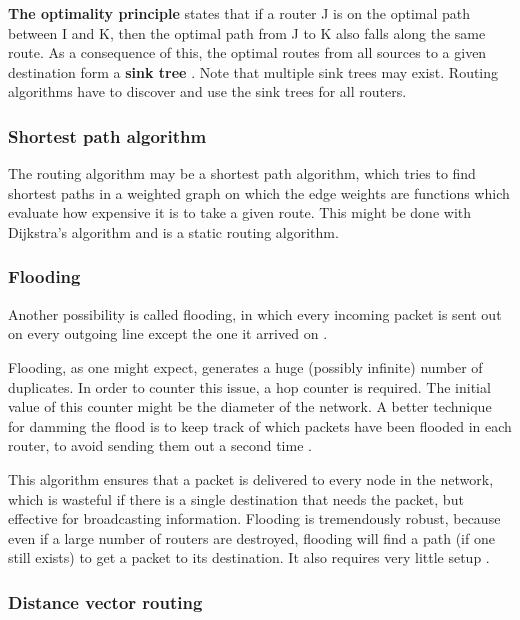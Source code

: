 \textbf{The optimality principle} states that if a router J is on the optimal path between I and K, then the optimal path from J to K also falls along the same route. As a consequence of this, the optimal routes from all sources to a given destination form a \textbf{sink tree} \cite{dynamic-programming-bellman-2003}. Note that multiple sink trees may exist. Routing algorithms have to discover and use the sink trees for all routers.

\subsubsection{Shortest path algorithm}\label{Shortest path algorithm}

The routing algorithm may be a shortest path algorithm, which tries to find shortest paths in a weighted graph on which the edge weights are functions which evaluate how expensive it is to take a given route.
This might be done with Dijkstra's algorithm and is a static routing algorithm.

\subsubsection{Flooding}

Another possibility is called flooding, in which every incoming packet is sent out on every outgoing line except the one it arrived on \cite[p.~368]{computer-networks-tanenbaum-2012}.

Flooding, as one might expect, generates a huge (possibly infinite) number of duplicates. In order to counter this issue, a hop counter is required. The initial value of this counter might be the diameter of the network. A better technique for damming the flood is to keep track of which packets have been flooded in each router, to avoid sending them out a second time \cite[p.~368]{computer-networks-tanenbaum-2012}.

This algorithm ensures that a packet is delivered to every node in the network, which is wasteful if there is a single destination that needs the packet, but effective for broadcasting information. Flooding is tremendously robust, because even if a large number of routers are destroyed, flooding will find a path (if one still exists) to get a packet to its destination. It also requires very little setup \cite[p.~370]{computer-networks-tanenbaum-2012}.

\subsubsection{Distance vector routing}\label{Distance vector routing}

